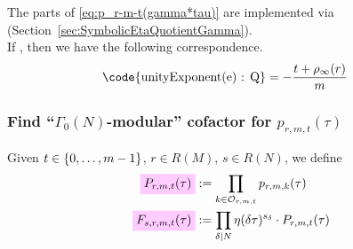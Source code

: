 \documentclass{article}
\begin{document}
The parts of \eqref{eq:p_r-m-t(gamma*tau)} are implemented via
\textcolor{blue}{}
(Section~\ref{sec:SymbolicEtaQuotientGamma}).
\\
If , then we have the
following correspondence.
\begin{align*}
  \text{\code{unityExponent(e) : Q}}
  &=
    -\frac{t+\rho_\infty(r)}{m}
\end{align*}






\subsubsection{Find ``$\Gamma_0(N)$-modular'' cofactor for $p_{r,m,t}(\tau)$}


\begin{Definition}\cite[Def.~44]{Radu_RamanujanKolberg_2015}
  Given $t\in\left\{0,\ldots,m-1\right\}$, $r \in R(M)$, $s \in R(N)$, we
  define
  \begin{align}
    \defineNotation[P-r-m-t-tau]{P_{r, m, t}(\tau)}
    &:= \prod_{k \in \modularOrbit{r,m,t}} p_{r,m,k}(\tau)\\
    \defineNotation[F-s-r-m-t-tau]{F_{s, r, m, t}(\tau)}
    &:= \divisorprod{N} \eta(\delta\tau)^{s_\delta} \cdot P_{r, m, t}(\tau)
  \end{align}
\end{Definition}
\end{document}
